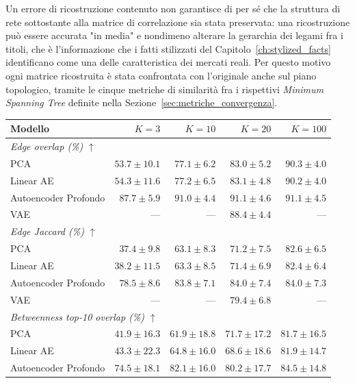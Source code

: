 Un errore di ricostruzione contenuto non garantisce di per sé che la struttura di rete sottostante alla matrice di correlazione sia stata preservata: una ricostruzione può essere accurata "in media" e nondimeno alterare la gerarchia dei legami fra i titoli, che è l'informazione che i fatti stilizzati del Capitolo~\ref{ch:stylized_facts} identificano come una delle caratteristica dei mercati reali. Per questo motivo ogni matrice ricostruita è stata confrontata con l'originale anche sul piano topologico, tramite le cinque metriche di similarità fra i rispettivi \emph{Minimum Spanning Tree} definite nella Sezione~\ref{sec:metriche_convergenza}.

\begin{table}[htbp]
\centering
\small
\setlength{\tabcolsep}{4pt}
\begin{tabular}{lrrrr}
\hline
\textbf{Modello} & $K=3$ & $K=10$ & $K=20$ & $K=100$ \\
\hline
\multicolumn{5}{l}{\textit{Edge overlap (\%)} $\uparrow$} \\
PCA & $53.7 \pm 10.1$ & $77.1 \pm 6.2$ & $83.0 \pm 5.2$ & $90.3 \pm 4.0$ \\
Linear AE & $54.3 \pm 11.6$ & $77.2 \pm 6.5$ & $83.1 \pm 4.8$ & $90.2 \pm 4.0$ \\
Autoencoder Profondo & $\mathbf{87.7 \pm 5.9}$ & $\mathbf{91.0 \pm 4.4}$ & $\mathbf{91.1 \pm 4.6}$ & $\mathbf{91.1 \pm 4.5}$ \\
VAE & --- & --- & $88.4 \pm 4.4$ & --- \\
\hline
\multicolumn{5}{l}{\textit{Edge Jaccard (\%)} $\uparrow$} \\
PCA & $37.4 \pm 9.8$ & $63.1 \pm 8.3$ & $71.2 \pm 7.5$ & $82.6 \pm 6.5$ \\
Linear AE & $38.2 \pm 11.5$ & $63.3 \pm 8.5$ & $71.4 \pm 6.9$ & $82.4 \pm 6.4$ \\
Autoencoder Profondo & $\mathbf{78.5 \pm 8.6}$ & $\mathbf{83.8 \pm 7.1}$ & $\mathbf{84.0 \pm 7.4}$ & $\mathbf{84.0 \pm 7.3}$ \\
VAE & --- & --- & $79.4 \pm 6.8$ & --- \\
\hline
\multicolumn{5}{l}{\textit{Betweenness top-10 overlap (\%)} $\uparrow$} \\
PCA & $41.9 \pm 16.3$ & $61.9 \pm 18.8$ & $71.7 \pm 17.2$ & $81.7 \pm 16.5$ \\
Linear AE & $43.3 \pm 22.3$ & $64.8 \pm 16.0$ & $68.6 \pm 18.6$ & $81.9 \pm 14.7$ \\
Autoencoder Profondo & $\mathbf{74.5 \pm 18.1}$ & $\mathbf{82.1 \pm 16.0}$ & $\mathbf{80.2 \pm 17.7}$ & $\mathbf{84.5 \pm 14.8}$ \\

\end{tabular}
\end{table}
